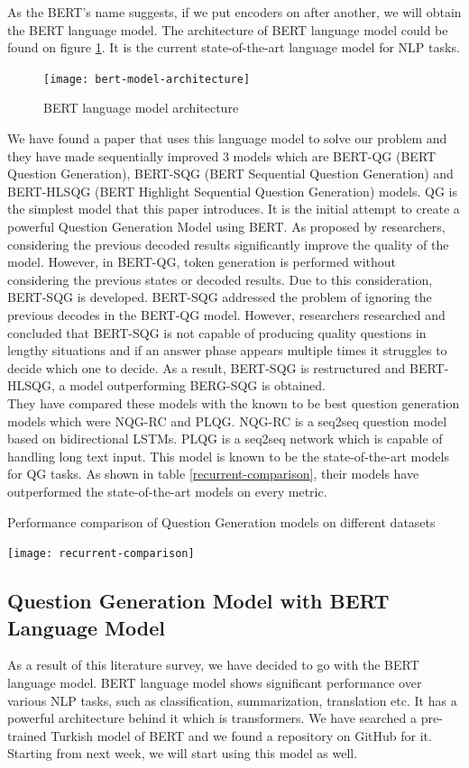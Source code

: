 \documentclass{mefsdp}
\begin{document}
	As the BERT’s name suggests, if we put encoders on after another, we will obtain the BERT language model. The architecture of BERT language model could be found on figure \ref{bert-architecture}. It is the current state-of-the-art language model for NLP tasks. \cite{chan-fan-2019-recurrent}
	
	\begin{figure}[ht!]
		\centering
		\texttt{[image: bert-model-architecture]}
		\caption{BERT language model architecture\label{bert-architecture}}
	\end{figure}
	We have found a paper that uses this language model to solve our problem and they have made sequentially improved 3 models which are BERT-QG (BERT Question Generation), BERT-SQG (BERT Sequential Question Generation) and BERT-HLSQG (BERT Highlight Sequential Question Generation) models. QG is the simplest model that this paper introduces. It is the initial attempt to create a powerful Question Generation Model using BERT. As proposed by researchers, considering the previous decoded results significantly improve the quality of the model. However, in BERT-QG, token generation is performed without considering the previous states or decoded results. Due to this consideration, BERT-SQG is developed. BERT-SQG addressed the problem of ignoring the previous decodes in the BERT-QG model. However, researchers researched and concluded that BERT-SQG is not capable of producing quality questions in lengthy situations and if an answer phase appears multiple times it struggles to decide which one to decide. As a result, BERT-SQG is restructured and BERT-HLSQG, a model outperforming BERG-SQG is obtained.\\
	
	They have compared these models with the known to be best question generation models which were NQG-RC and PLQG. NQG-RC is a seq2seq question model based on bidirectional LSTMs. PLQG is a seq2seq network which is capable of handling long text input. This model is known to be the state-of-the-art models for QG tasks. As shown in table \ref{recurrent-comparison}, their models have outperformed the state-of-the-art models on every metric.\\
	\begin{table}[ht!]
		\caption{Performance comparison of Question Generation models on different datasets\label{recurrent-comparison}}
		\centering
		\texttt{[image: recurrent-comparison]}
	\end{table}
	
	\subsection{Question Generation Model with BERT Language Model}
	As a result of this literature survey, we have decided to go with the BERT language model. BERT language model shows significant performance over various NLP tasks, such as classification, summarization, translation etc. It has a powerful architecture behind it which is transformers. We have searched a pre-trained Turkish model of BERT and we found a repository on GitHub for it. Starting from next week, we will start using this model as well.\\
	
\end{document}
